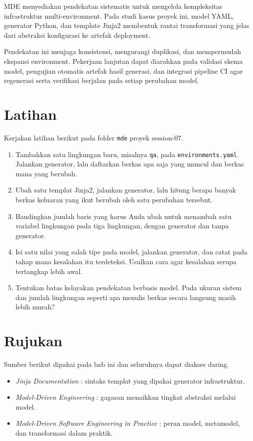 MDE menyediakan pendekatan sistematis untuk mengelola kompleksitas infrastruktur multi-environment. Pada studi kasus proyek ini, model YAML, generator Python, dan template Jinja2 membentuk rantai transformasi yang jelas dari abstraksi konfigurasi ke artefak deployment.

Pendekatan ini menjaga konsistensi, mengurangi duplikasi, dan mempermudah ekspansi environment. Pekerjaan lanjutan dapat diarahkan pada validasi skema model, pengujian otomatis artefak hasil generasi, dan integrasi pipeline CI agar regenerasi serta verifikasi berjalan pada setiap perubahan model.

\section{Latihan}

Kerjakan latihan berikut pada folder \texttt{mde} proyek session-07.

\begin{enumerate}
  \item Tambahkan satu lingkungan baru, misalnya \texttt{qa}, pada \texttt{environments.yaml}. Jalankan generator, lalu daftarkan berkas apa saja yang muncul dan berkas mana yang berubah.
  \item Ubah satu templat Jinja2, jalankan generator, lalu hitung berapa banyak berkas keluaran yang ikut berubah oleh satu perubahan tersebut.
  \item Bandingkan jumlah baris yang harus Anda ubah untuk menambah satu variabel lingkungan pada tiga lingkungan, dengan generator dan tanpa generator.
  \item Isi satu nilai yang salah tipe pada model, jalankan generator, dan catat pada tahap mana kesalahan itu terdeteksi. Usulkan cara agar kesalahan serupa tertangkap lebih awal.
  \item Tentukan batas kelayakan pendekatan berbasis model. Pada ukuran sistem dan jumlah lingkungan seperti apa menulis berkas secara langsung masih lebih murah?
\end{enumerate}

\section{Rujukan}

Sumber berikut dipakai pada bab ini dan seluruhnya dapat diakses daring.

\begin{itemize}
  \item \textit{Jinja Documentation} \cite{doc-jinja}: sintaks templat yang dipakai generator infrastruktur.
  \item \textit{Model-Driven Engineering} \cite{schmidt2006mde}: gagasan menaikkan tingkat abstraksi melalui model.
  \item \textit{Model-Driven Software Engineering in Practice} \cite{brambilla2017mdse}: peran model, metamodel, dan transformasi dalam praktik.
\end{itemize}
